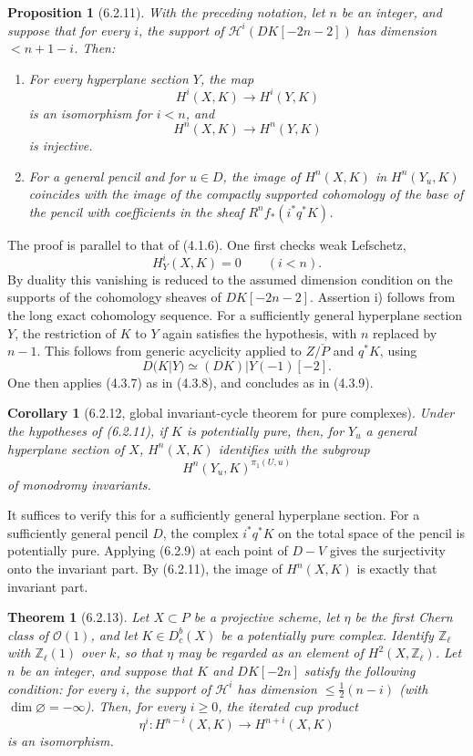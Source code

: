 \documentclass[11pt]{article}
\newtheorem{theorem}{Theorem}
\newtheorem{proposition}{Proposition}
\newtheorem{corollary}{Corollary}
\theoremstyle{remark}
\newcommand{\Zl}{\mathbb{Z}_\ell}
\begin{document}
\begin{proposition}[6.2.11]
With the preceding notation, let \(n\) be an integer, and suppose that for every \(i\), the support of \(\mathcal H^i(DK[-2n-2])\) has dimension \(<n+1-i\).  Then:
\begin{enumerate}[label=\roman*)]
\item For every hyperplane section \(Y\), the map
\[
H^i(X,K)\longrightarrow H^i(Y,K)
\]
is an isomorphism for \(i<n\), and
\[
H^n(X,K)\longrightarrow H^n(Y,K)
\]
is injective.
\item For a general pencil and for \(u\in D\), the image of \(H^n(X,K)\) in \(H^n(Y_u,K)\) coincides with the image of the compactly supported cohomology of the base of the pencil with coefficients in the sheaf \(R^nf_*(i^*q^*K)\).
\end{enumerate}
\end{proposition}

The proof is parallel to that of (4.1.6).  One first checks weak Lefschetz,
\[
H^i_Y(X,K)=0 \qquad (i<n).
\]
By duality this vanishing is reduced to the assumed dimension condition on the supports of the cohomology sheaves of \(DK[-2n-2]\).  Assertion i) follows from the long exact cohomology sequence.  For a sufficiently general hyperplane section \(Y\), the restriction of \(K\) to \(Y\) again satisfies the hypothesis, with \(n\) replaced by \(n-1\).  This follows from generic acyclicity applied to \(Z/\check P\) and \(q^*K\), using
\[
D(K|Y)\simeq (DK)|Y(-1)[-2].
\]
One then applies (4.3.7) as in (4.3.8), and concludes as in (4.3.9).

\begin{corollary}[6.2.12, global invariant-cycle theorem for pure complexes]
Under the hypotheses of (6.2.11), if \(K\) is potentially pure, then, for \(Y_u\) a general hyperplane section of \(X\), \(H^n(X,K)\) identifies with the subgroup
\[
H^n(Y_u,K)^{\pi_1(U,u)}
\]
of monodromy invariants.
\end{corollary}

It suffices to verify this for a sufficiently general hyperplane section.  For a sufficiently general pencil \(D\), the complex \(i^*q^*K\) on the total space of the pencil is potentially pure.  Applying (6.2.9) at each point of \(D-V\) gives the surjectivity onto the invariant part.  By (6.2.11), the image of \(H^n(X,K)\) is exactly that invariant part.

\begin{theorem}[6.2.13]
Let \(X\subset P\) be a projective scheme, let \(\eta\) be the first Chern class of \(\mathcal O(1)\), and let \(K\in D^b_c(X)\) be a potentially pure complex.  Identify \(\Zl\) with \(\Zl(1)\) over \(k\), so that \(\eta\) may be regarded as an element of \(H^2(X,\Zl)\).  Let \(n\) be an integer, and suppose that \(K\) and \(DK[-2n]\) satisfy the following condition: for every \(i\), the support of \(\mathcal H^i\) has dimension \(\le \frac12(n-i)\) (with \(\dim\varnothing=-\infty\)).  Then, for every \(i\ge0\), the iterated cup product
\[
\eta^i:H^{n-i}(X,K)\longrightarrow H^{n+i}(X,K)
\]
is an isomorphism.
\end{theorem}
\end{document}

